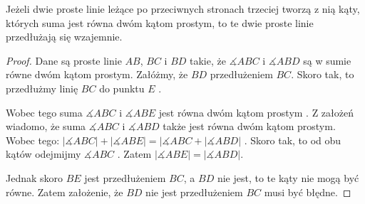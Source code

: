 \documentclass[12pt, a4paper]{scrartcl}
\begin{document}
\begin{theorem}
    Jeżeli dwie proste linie leżące po przeciwnych stronach trzeciej tworzą
    z nią kąty, których suma jest równa dwóm kątom prostym, to te dwie proste
    linie przedłużają się wzajemnie.

    \begin{figure}[!h]
        \begin{center}
        \end{center}
    \end{figure}

    \begin{proof}
        Dane są proste linie \(AB\), \(BC\) i \(BD\) takie, że \(\measuredangle
        ABC\) i \(\measuredangle ABD\) są w sumie równe dwóm kątom prostym.
        Załóżmy, że \(BD\)  przedłużeniem \(BC\). Skoro tak,
        to przedłużmy linię \(BC\) do punktu \(E\) .

        Wobec tego suma \(\measuredangle ABC\) i \(\measuredangle ABE\) jest
        równa dwóm kątom prostym . Z założeń wiadomo, że suma
        \(\measuredangle ABC\) i \(\measuredangle ABD\) także jest równa dwóm
        kątom prostym. Wobec tego: \( |\measuredangle ABC| +
        |\measuredangle ABE| = |\measuredangle ABC + |\measuredangle ABD| \)
        . Skoro tak, to od obu kątów odejmijmy \(\measuredangle ABC\)
        . Zatem \(|\measuredangle ABE| = |\measuredangle ABD|\).

        Jednak skoro \(BE\) jest przedłużeniem \(BC\), a \(BD\) nie jest, to
        te kąty nie mogą być równe. Zatem założenie, że \(BD\) nie jest
        przedłużeniem \(BC\) musi być błędne.
    \end{proof}
\end{theorem}
\end{document}
